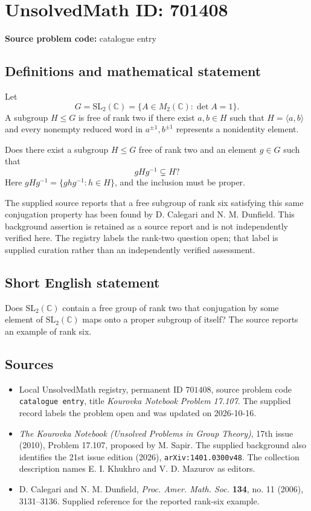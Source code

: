 \documentclass[11pt]{article}
\newcommand{\C}{\mathbb{C}}
\begin{document}
\section*{UnsolvedMath ID: 701408}
\textbf{Source problem code:} catalogue entry
\subsection{Definitions and mathematical statement}
Let
\[
G=\mathrm{SL}_2(\C)=\{A\in M_2(\C):\det A=1\}.
\]
A subgroup \(H\leq G\) is free of rank two if there exist \(a,b\in H\) such that \(H=\langle a,b\rangle\) and every nonempty reduced word in \(a^{\pm1},b^{\pm1}\) represents a nonidentity element.

Does there exist a subgroup \(H\leq G\) free of rank two and an element \(g\in G\) such that
\[
gHg^{-1}\subsetneq H?
\]
Here \(gHg^{-1}=\{ghg^{-1}:h\in H\}\), and the inclusion must be proper.

The supplied source reports that a free subgroup of rank six satisfying this same conjugation property has been found by D. Calegari and N. M. Dunfield. This background assertion is retained as a source report and is not independently verified here. The registry labels the rank-two question open; that label is supplied curation rather than an independently verified assessment.
\subsection{Short English statement}
Does \(\mathrm{SL}_2(\C)\) contain a free group of rank two that conjugation by some element of \(\mathrm{SL}_2(\C)\) maps onto a proper subgroup of itself? The source reports an example of rank six.
\subsection{Sources}
\begin{itemize}
\item Local UnsolvedMath registry, permanent ID \(701408\), source problem code \texttt{catalogue entry}, title \emph{Kourovka Notebook Problem 17.107}. The supplied record labels the problem open and was updated on 2026-10-16.
\item \emph{The Kourovka Notebook (Unsolved Problems in Group Theory)}, 17th issue (2010), Problem 17.107, proposed by M. Sapir. The supplied background also identifies the 21st issue edition (2026), \texttt{arXiv:1401.0300v48}. The collection description names E. I. Khukhro and V. D. Mazurov as editors.
\item D. Calegari and N. M. Dunfield, \emph{Proc. Amer. Math. Soc.} \textbf{134}, no. 11 (2006), 3131--3136. Supplied reference for the reported rank-six example.
\end{itemize}
\end{document}
